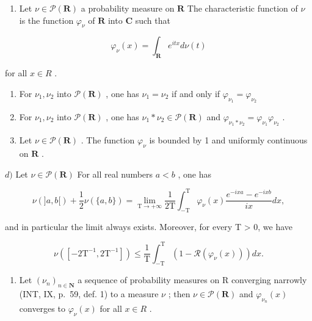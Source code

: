 \begin{enumerate}
\def\labelenumi{\arabic{enumi})}
\setcounter{enumi}{38}
\tightlist
\item
  Let \(\nu \in \mathcal{P}(\mathbf{R})\) a probability measure on \(\mathbf{R}\) The characteristic function of \(\nu\) is the function \(\varphi_{\nu}\) of \(\mathbf{R}\) into \(\mathbf{C}\) such that
\end{enumerate}

\[
\varphi_ {\nu} (x) = \int_ {\mathbf {R}} e ^ {i t x} d \nu (t)
\]

for all \(x \in R\) .

\begin{enumerate}
\def\labelenumi{\alph{enumi})}
\item
  For \(\nu_{1},\nu_{2}\) into \(\mathcal{P}(\mathbf{R})\) , one has \(\nu_{1} = \nu_{2}\) if and only if \(\varphi_{\nu_1} = \varphi_{\nu_2}\)
\item
  For \(\nu_{1},\nu_{2}\) into \(\mathcal{P}(\mathbf{R})\) , one has \(\nu_{1}*\nu_{2}\in \mathcal{P}(\mathbf{R})\) and \(\varphi_{\nu_1*\nu_2} = \varphi_{\nu_1}\varphi_{\nu_2}\) .
\item
  Let \(\nu \in \mathcal{P}(\mathbf{R})\) . The function \(\varphi_{\nu}\) is bounded by 1 and uniformly continuous on \(\mathbf{R}\) .
\end{enumerate}

\(d)\) Let \(\nu \in \mathcal{P}(\mathbf{R})\) For all real numbers \(a < b\) , one has

\[
\nu (] a, b [) + \frac {1}{2} \nu (\{a, b \}) = \lim _ {\mathrm{T} \rightarrow + \infty} \frac {1}{2 \mathrm{T}} \int_ {- \mathrm{T}} ^ {\mathrm{T}} \varphi_ {\nu} (x) \frac {e ^ {- i x a} - e ^ {- i x b}}{i x} d x,
\]

and in particular the limit always exists. Moreover, for every T \textgreater{} 0, we have

\[
\nu ([ - 2 \mathrm{T} ^ {- 1}, 2 \mathrm{T} ^ {- 1} ]) \leqslant \frac {1}{\mathrm{T}} \int_ {- \mathrm{T}} ^ {\mathrm{T}} \left(1 - \mathcal {R} (\varphi_ {\nu} (x))\right) d x.
\]

\begin{enumerate}
\def\labelenumi{\alph{enumi})}
\setcounter{enumi}{4}
\tightlist
\item
  Let \((\nu_{n})_{n\in\mathbf{N}}\) a sequence of probability measures on R converging narrowly (INT, IX, p.~59, def. 1) to a measure \(\nu\) ; then \(\nu\in\mathcal{P}(\mathbf{R})\) and \(\varphi_{\nu_{n}}(x)\) converges to \(\varphi_{\nu}(x)\) for all \(x\in R\) .
\end{enumerate}

